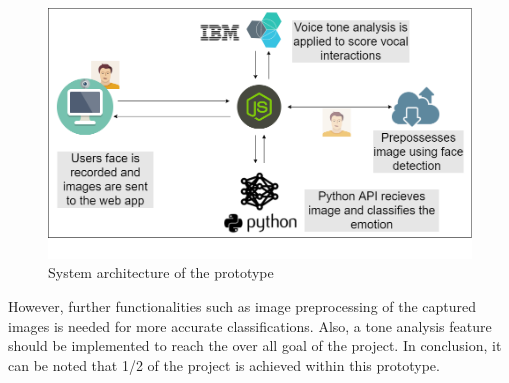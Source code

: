 \begin{figure}[ht]
	\begin{center}
		\advance\leftskip-3cm
		\advance\rightskip-3cm
		\includegraphics[keepaspectratio=true,scale=0.5]{__resources/arch.png}
		\caption{System architecture of the prototype}
		\label{proto}
	\end{center}
\end{figure}

However, further functionalities such as image preprocessing of the captured images is needed for more accurate classifications. Also, a tone analysis feature should be implemented to reach the over all goal of the project.
In conclusion, it can be noted that 1/2 of the project is achieved within this prototype.


